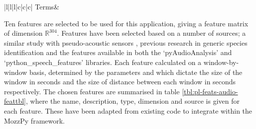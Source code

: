 \begin{table}[ht]
\begin{tabular}{|l|l|l|c|c|c|}
                    \hline
                    \hline
                        Terms&\cr
                    \hline
                \end{tabular}
            \caption{Summary of features implemented in MozzPy.}
            \label{tbl:pl-feats-audio-feattbl}
        \end{table}
        Ten features are selected to be used for this application, giving a feature matrix of dimension $\mathbb{R}^{304}$. Features have been selected based on a number of sources; a similar study with pseudo-acoustic sensors \cite{Silva2013}, previous research in generic species identification \cite{Zilli2016} and the features available in both the `pyAudioAnalysis' \cite{Giannakopoulos2015} and `python\_speech\_features' \cite{Lyons} libraries. Each feature calculated on a window-by-window basis, determined by the parameters  and  which dictate the size of the window in seconds and the size of distance between each window in seconds respectively. 
        The chosen features are summarised in table \ref{tbl:pl-feats-audio-feattbl}, where the name, description, type, dimension and source is given for each feature. These have been adapted from existing code to integrate within the MozzPy framework.
        
